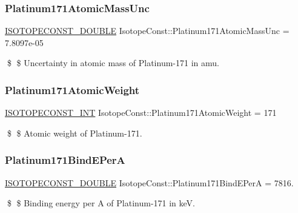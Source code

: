\subsubsection{\texorpdfstring{Platinum171\+Atomic\+Mass\+Unc}{Platinum171AtomicMassUnc}}
{\footnotesize\ttfamily \mbox{\hyperlink{group___isotope_const-_macros_ga8f45a7272ce02c0b4c65c44636ed719a}{I\+S\+O\+T\+O\+P\+E\+C\+O\+N\+S\+T\+\_\+\+D\+O\+U\+B\+LE}} Isotope\+Const\+::\+Platinum171\+Atomic\+Mass\+Unc = 7.\+8097e-\/05}

\$ \$ Uncertainty in atomic mass of Platinum-\/171 in amu. \mbox{\label{group___isotope_const-_platinum-_pt171_gad5e32bf266f44f48c71497a9f1c02251}} 
\subsubsection{\texorpdfstring{Platinum171\+Atomic\+Weight}{Platinum171AtomicWeight}}
{\footnotesize\ttfamily \mbox{\hyperlink{group___isotope_const-_macros_ga5f18360b3e99483a35c32d789e62621c}{I\+S\+O\+T\+O\+P\+E\+C\+O\+N\+S\+T\+\_\+\+I\+NT}} Isotope\+Const\+::\+Platinum171\+Atomic\+Weight = 171}

\$ \$ Atomic weight of Platinum-\/171. \mbox{\label{group___isotope_const-_platinum-_pt171_ga3e29485c6108e54fdb9600769354c380}} 
\subsubsection{\texorpdfstring{Platinum171\+Bind\+E\+PerA}{Platinum171BindEPerA}}
{\footnotesize\ttfamily \mbox{\hyperlink{group___isotope_const-_macros_ga8f45a7272ce02c0b4c65c44636ed719a}{I\+S\+O\+T\+O\+P\+E\+C\+O\+N\+S\+T\+\_\+\+D\+O\+U\+B\+LE}} Isotope\+Const\+::\+Platinum171\+Bind\+E\+PerA = 7816.}

\$ \$ Binding energy per A of Platinum-\/171 in keV. \mbox{\label{group___isotope_const-_platinum-_pt171_ga86fa83ba13bd285e358af7678b619210}} 
